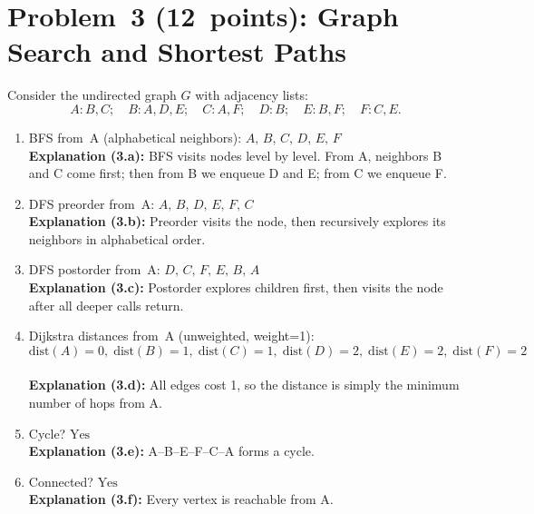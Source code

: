 \documentclass[12pt]{article}
\begin{document}
\newpage

\section*{Problem 3 (12 points): Graph Search and Shortest Paths}
Consider the undirected graph \(G\) with adjacency lists:
\[
A: B,C;\quad
B: A,D,E;\quad
C: A,F;\quad
D: B;\quad
E: B,F;\quad
F: C,E.
\]
\begin{enumerate}[label=\alph*)]
  \item BFS from A (alphabetical neighbors): \(\boxed{A,\,B,\,C,\,D,\,E,\,F}\)  
    \\
    \textbf{Explanation (3.a):} BFS visits nodes level by level. From A, neighbors B and C come first; then from B we enqueue D and E; from C we enqueue F.
  \item DFS preorder from A: \(\boxed{A,\,B,\,D,\,E,\,F,\,C}\)  
    \\
    \textbf{Explanation (3.b):} Preorder visits the node, then recursively explores its neighbors in alphabetical order.
  \item DFS postorder from A: \(\boxed{D,\,C,\,F,\,E,\,B,\,A}\)  
    \\
    \textbf{Explanation (3.c):} Postorder explores children first, then visits the node after all deeper calls return.
  \item Dijkstra distances from A (unweighted, weight=1):
    \[
      \text{dist}(A)=0,\;
      \text{dist}(B)=1,\;
      \text{dist}(C)=1,\;
      \text{dist}(D)=2,\;
      \text{dist}(E)=2,\;
      \text{dist}(F)=2
    \]
    \\
    \textbf{Explanation (3.d):} All edges cost 1, so the distance is simply the minimum number of hops from A.
  \item Cycle? \(\boxed{\text{Yes}}\)  
    \\
    \textbf{Explanation (3.e):} A–B–E–F–C–A forms a cycle.
  \item Connected? \(\boxed{\text{Yes}}\)  
    \\
    \textbf{Explanation (3.f):} Every vertex is reachable from A.
\end{enumerate}

\newpage
\end{document}
